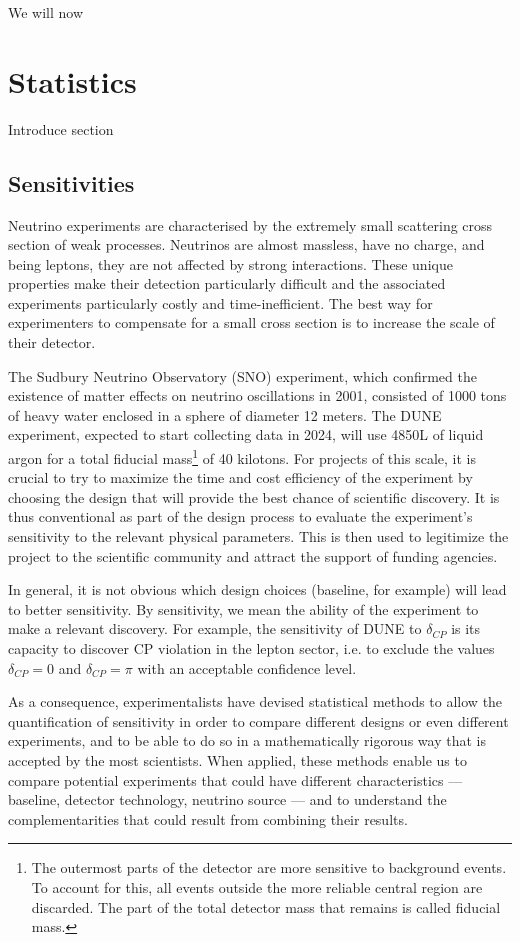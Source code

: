 \label{ch:methods}
We will now

\section{Statistics}
Introduce section

\subsection{Sensitivities}
Neutrino experiments are characterised by the extremely small scattering cross
section of weak processes. Neutrinos are almost massless, have no charge, and
being leptons, they are not affected by strong interactions. These unique
properties make their detection particularly difficult and the associated
experiments particularly costly and time-inefficient. The best way for
experimenters to compensate for a small cross section is to increase the scale
of their detector. 

The Sudbury Neutrino Observatory (SNO) experiment, which confirmed
the existence of matter effects on neutrino oscillations in 2001, consisted of 1000
tons of heavy water enclosed in a sphere of diameter 12 meters\cite{thomson}.
The DUNE experiment, expected to start collecting data in 2024, will use 4850L
of liquid argon for a total fiducial mass\footnote{The outermost parts of the
detector are more sensitive to background events. To account for this, all
events outside the more reliable central region are discarded. The part of the
total detector mass that remains is called fiducial mass.} of 40 kilotons\cite{cdr}.
For projects of this scale, it is crucial to try to maximize the time and cost
efficiency of the experiment by choosing the design that will provide the best
chance of scientific discovery. It is thus conventional as part of the design
process to evaluate the experiment's sensitivity to the relevant physical
parameters. This is then used to legitimize the project to the scientific
community and attract the support of funding agencies.

In general, it is not obvious which design choices (baseline, for example) will lead to better
sensitivity. By sensitivity, we mean the ability of the experiment to make a
relevant discovery. For example, the sensitivity of DUNE to $\delta_{CP}$ is
its capacity to discover CP violation in the lepton sector, i.e. to exclude the
values $\delta_{CP}=0$ and $\delta_{CP}=\pi$ with an acceptable confidence
level.

As a consequence, experimentalists have devised statistical methods to allow
the quantification of sensitivity in order to compare different designs or even
different experiments, and to be able to do so in a mathematically rigorous way that is
accepted by the most scientists.
When applied, these methods enable us to compare potential experiments that
could have different characteristics --- baseline, detector technology,
neutrino source --- and to understand the complementarities that could result
from combining their results.


